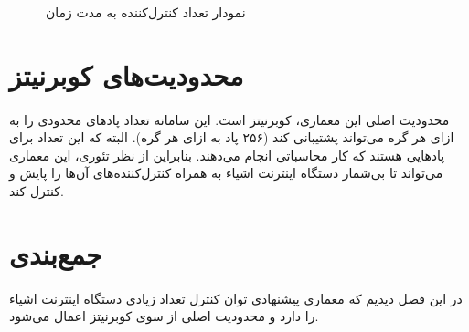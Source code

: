 {    \begin{figure}[H]
        \caption{نمودار تعداد کنترل‌کننده به مدت زمان}
        \label{fig:different_controllers_plot}
    \end{figure}
}

\section{محدودیت‌های کوبرنیتز}
\label{sec:kubernetes_limitations}
\paragraph{}
{
    محدودیت اصلی این معماری، کوبرنیتز است. این سامانه تعداد پاد‌های محدودی را به ازای هر گره می‌تواند پشتیبانی کند (۲۵۶ پاد به ازای هر گره).
    البته که این تعداد برای پاد‌هایی هستند که کار محاسباتی انجام می‌دهند. بنابراین از نظر تئوری، این معماری می‌تواند تا 
    بی‌شمار دستگاه اینترنت‌ اشیاء به همراه کنترل‌کننده‌های آن‌ها را پایش و کنترل کند.
}

\section{جمع‌بندی}
\paragraph{}
{
    در این فصل دیدیم که معماری پیشنهادی توان کنترل تعداد زیادی دستگاه‌ اینترنت اشیاء را دارد و محدودیت اصلی از سوی کوبرنیتز
    اعمال می‌شود.
}